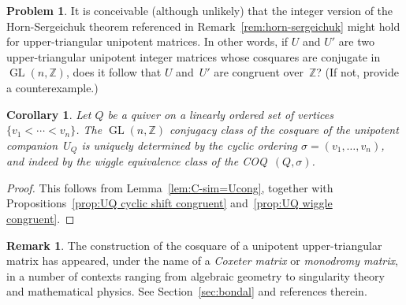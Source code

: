 \documentclass[11pt, letterpaper]{amsart}
\newtheorem{corollary}[theorem]{Corollary}
\theoremstyle{definition}
\newtheorem{remark}[theorem]{Remark}
\newtheorem{problem}[theorem]{Problem}
\numberwithin{equation}{section}
\def\ZZ{{\mathbb Z}}
\def\GL{{\operatorname{GL}}}
\begin{document}
\pagebreak[3]

\begin{problem}
It is conceivable (although unlikely) that the integer %
version of the Horn-Sergeichuk theorem referenced in Remark~\ref{rem:horn-sergeichuk} 
might hold for upper-triangular unipotent matrices. 
In other words, if $U$ and $U'$ are two upper-triangular unipotent integer matrices whose cosquares
are conjugate in $\GL(n,\ZZ)$, does it follow that $U$ and~$U'$ are congruent over~$\ZZ$?
(If not, provide a counterexample.) 
\end{problem}

\begin{corollary}
\label{cor:similarity-U}
Let $Q$ be a quiver on a linearly ordered set of vertices ${\{v_1\!<\cdots<v_n\}}$. 
The $\GL(n,\ZZ)$ conjugacy class of the cosquare of the unipotent companion~$U_Q$ 
is uniquely determined by the cyclic ordering $\sigma=(v_1,\dots,v_n)$, and indeed by 
the wiggle equivalence class of the COQ~$(Q,\sigma)$. 
\end{corollary}


\begin{proof}
This follows from Lemma~\ref{lem:C-sim=Ucong}, 
together with Propositions~\ref{prop:UQ cyclic shift congruent} 
and~\ref{prop:UQ wiggle congruent}. 
\end{proof}

\begin{remark}
The construction of the cosquare of a unipotent upper-triangular matrix has appeared, 
under the name of a \emph{Coxeter matrix} or \emph{monodromy matrix}, 
in a number of contexts ranging from algebraic geometry to singularity theory and mathematical physics. 
See Section~\ref{sec:bondal} and references therein. 
\end{remark}
\end{document}
